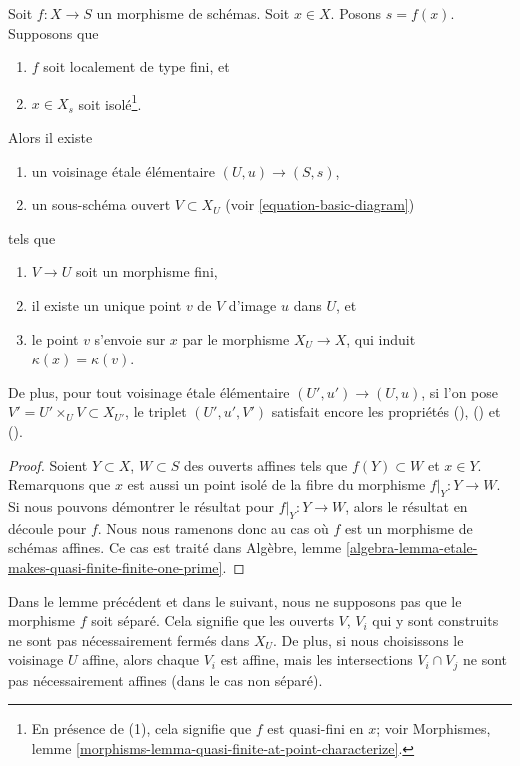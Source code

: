 \begin{lemma}
\label{lemma-etale-makes-quasi-finite-finite-at-point}
Soit $f : X \to S$ un morphisme de schémas.
Soit $x \in X$. Posons $s = f(x)$.
Supposons que
\begin{enumerate}
\item $f$ soit localement de type fini, et
\item $x \in X_s$ soit isolé\footnote{En présence de (1),
cela signifie que $f$ est
quasi-fini en $x$; voir
Morphismes, lemme \ref{morphisms-lemma-quasi-finite-at-point-characterize}.}.
\end{enumerate}
Alors il existe
\begin{enumerate}
\item[(a)] un voisinage \'etale élémentaire $(U, u) \to (S, s)$,
\item[(b)] un sous-schéma ouvert $V \subset X_U$
(voir \ref{equation-basic-diagram})
\end{enumerate}
tels que
\begin{enumerate}
\item[(\romannumeral1)] $V \to U$ soit un morphisme fini,
\item[(\romannumeral2)] il existe un unique point $v$ de $V$
d'image $u$ dans $U$, et
\item[(\romannumeral3)] le point $v$ s'envoie sur $x$
par le morphisme $X_U \to X$, qui induit $\kappa(x) = \kappa(v)$.
\end{enumerate}
De plus, pour tout voisinage \'etale élémentaire $(U', u') \to (U, u)$,
si l'on pose $V' = U' \times_U V \subset X_{U'}$, le triplet $(U', u', V')$
satisfait encore les propriétés
(), () et ().
\end{lemma}

\begin{proof}
Soient $Y \subset X$, $W \subset S$ des ouverts affines tels que
$f(Y) \subset W$ et $x \in Y$. Remarquons que $x$ est
aussi un point isolé de la fibre du morphisme $f|_Y : Y \to W$.
Si nous pouvons démontrer le résultat pour $f|_Y : Y \to W$, alors le
résultat en découle pour $f$. Nous nous ramenons donc au cas où
$f$ est un morphisme de schémas affines. Ce cas est traité dans
Algèbre, lemme \ref{algebra-lemma-etale-makes-quasi-finite-finite-one-prime}.
\end{proof}

\noindent
Dans le lemme précédent et dans le suivant, nous ne supposons pas que le morphisme
$f$ soit séparé. Cela signifie que les ouverts $V$, $V_i$ qui y sont construits
ne sont pas nécessairement fermés dans $X_U$. De plus, si nous choisissons
le voisinage $U$ affine, alors chaque $V_i$ est affine, mais
les intersections $V_i \cap V_j$ ne sont pas nécessairement affines (dans le cas non
séparé).

